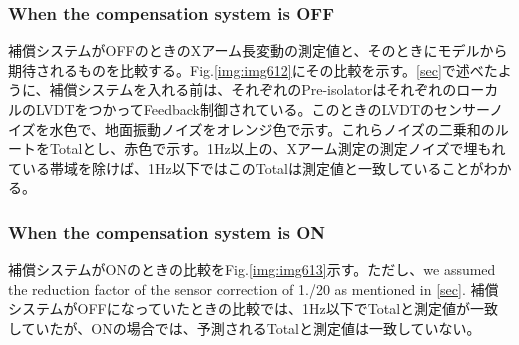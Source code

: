 \subsubsection{When the compensation system is OFF}
補償システムがOFFのときのXアーム長変動の測定値と、そのときにモデルから期待されるものを比較する。Fig.\ref{img:img612}にその比較を示す。\cref{sec}で述べたように、補償システムを入れる前は、それぞれのPre-isolatorはそれぞれのローカルのLVDTをつかってFeedback制御されている。このときのLVDTのセンサーノイズを水色で、地面振動ノイズをオレンジ色で示す。これらノイズの二乗和のルートをTotalとし、赤色で示す。1Hz以上の、Xアーム測定の測定ノイズで埋もれている帯域を除けば、1Hz以下ではこのTotalは測定値と一致していることがわかる。

\subsubsection{When the compensation system is ON}
補償システムがONのときの比較をFig.\ref{img:img613}示す。ただし、we assumed the reduction factor of the sensor correction of 1./20 as mentioned in \cref{sec}. 補償システムがOFFになっていたときの比較では、1Hz以下でTotalと測定値が一致していたが、ONの場合では、予測されるTotalと測定値は一致していない。

